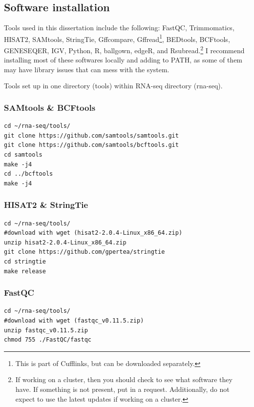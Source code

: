 \subsection{Software installation}
Tools used in this dissertation include the following: FastQC, Trimmomatics, HISAT2, SAMtools, StringTie, Gffcompare, Gffread\footnote{This is part of Cufflinks, but can be downloaded separately.}, BEDtools, BCFtools, GENESEQER, IGV, Python, R, ballgown, edgeR, and Rsubread.\footnote{If working on a cluster, then you should check to see what software they have. If something is not present, put in a request. Additionally, do not expect to use the latest updates if working on a cluster.}
I recommend installing most of these softwares locally and adding to PATH, as some of them may have library issues that can mess with the system.

Tools set up in one directory (tools) within RNA-seq directory (rna-seq).

\subsubsection*{SAMtools \& BCFtools}
\begin{verbatim}
cd ~/rna-seq/tools/
git clone https://github.com/samtools/samtools.git
git clone https://github.com/samtools/bcftools.git
cd samtools
make -j4
cd ../bcftools
make -j4
\end{verbatim}

\subsubsection*{HISAT2 \& StringTie}\footnotemark
{}
\begin{verbatim}
cd ~/rna-seq/tools/
#download with wget (hisat2-2.0.4-Linux_x86_64.zip)
unzip hisat2-2.0.4-Linux_x86_64.zip
git clone https://github.com/gpertea/stringtie
cd stringtie
make release
\end{verbatim}

\subsubsection*{FastQC}
\begin{verbatim}
cd ~/rna-seq/tools/
#download with wget (fastqc_v0.11.5.zip)
unzip fastqc_v0.11.5.zip  
chmod 755 ./FastQC/fastqc
\end{verbatim}

